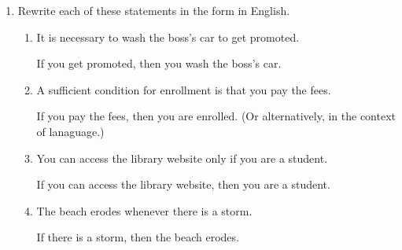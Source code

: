 \begin{enumerate} 
  \item Rewrite each of these statements in the form 
  in English.
  \begin{enumerate}
    \item It is necessary to wash the boss's car to get promoted.
    \begin{subanswer}
      If you get promoted, then you wash the boss's car.
    \end{subanswer}
    \item A sufficient condition for enrollment is that you pay the fees.
    \begin{subanswer}
      If you pay the fees, then you are enrolled. (Or alternatively,  in the context of lanaguage.)
    \end{subanswer}
    \item You can access the library website only if you are a student.
    \begin{subanswer}
      If you can access the library website, then you are a student.
    \end{subanswer}
    \item The beach erodes whenever there is a storm.
    \begin{subanswer}
      If there is a storm, then the beach erodes.
    \end{subanswer}
  \end{enumerate}

  \newpage



\end{enumerate}
